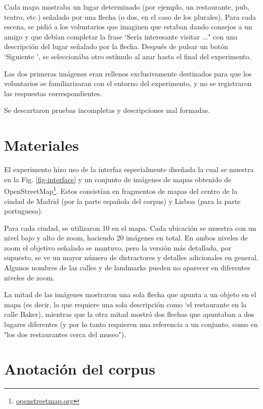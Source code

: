 Cada mapa mostraba un lugar determinado (por ejemplo, un restaurante, pub, teatro, etc.) se\~nalado por una flecha (o dos, en el caso de los plurales). Para cada escena, se pidi\'o a los voluntarios que imaginen que estaban dando consejos a un amigo y que deb\'{i}an completar la frase `Ser\'{i}a interesante visitar ..." con una descripci\'on del lugar se\~nalado por la flecha. Despu\'es de pulsar un bot\'on `Siguiente ', se seleccion\'aba otro est\'{i}mulo al azar hasta el final del experimento.

Las dos primeras im\'agenes eran rellenos exclusivamente destinados para que los voluntarios se familiarizaran con el entorno del experimento, y no se registraron las respuestas correspondientes. 

Se descartaron pruebas incompletas y descripciones mal formadas.


\section{Materiales}


El experimento hizo uso de la interfaz especialmente dise\~nada la cual se muestra en la Fig. \ref{fig-interface} y un conjunto de im\'agenes de mapas obtenido de OpenStreetMap\footnote{\url{openstreetmap.org}}. Estos consist\'{i}an en fragmentos de mapas del centro de la ciudad de Madrid (por la parte espa\~nola del corpus) y Lisboa (para la parte portuguesa).

Para cada ciudad, se utilizaron 10  en el mapa. Cada ubicaci\'on se muestra con un nivel bajo y alto de zoom, haciendo 20 im\'agenes en total. En ambos niveles de zoom el objetivo se\~{n}alado se mantuvo, pero la versi\'on m\'as detallada, por supuesto, se ve un mayor n\'umero de distractores y detalles adicionales en general. Algunos nombres de las calles y de landmarks pueden no aparecer en diferentes niveles de zoom.

La mitad de las im\'agenes mostraron una sola flecha que apunta a un objeto en el mapa (es decir, lo que requiere una sola descripci\'on como `el restaurante en la calle Baker), mientras que la otra mitad mostr\'o dos flechas que apuntaban a dos lugares diferentes (y por lo tanto requieren una referencia a un conjunto, como en "los dos restaurantes cerca del museo").


\section{Anotaci\'on del corpus}

